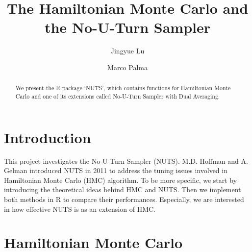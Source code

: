 \documentclass{article}
\title{The Hamiltonian Monte Carlo and the No-U-Turn Sampler}
\author{Jingyue Lu \and Marco Palma}
\begin{document}


\maketitle

\begin{abstract}
We present the R package `NUTS', which contains functions for Hamiltonian Monte Carlo and one of its extensions called No-U-Turn Sampler with Dual Averaging.
\end{abstract}

\section{Introduction}

This project investigates the No-U-Turn Sampler (NUTS). M.D. Hoffman and A. Gelman introduced NUTS in 2011 to address the tuning issues involved in Hamiltonian Monte Carlo (HMC) algorithm.
To be more specific, we start by introducing the theoretical ideas behind HMC and NUTS. Then we %
implement both methods in R to compare their performances. Especially, we are interested in how effective NUTS is as an extension of HMC.

\section{Hamiltonian Monte Carlo}
\end{document}
